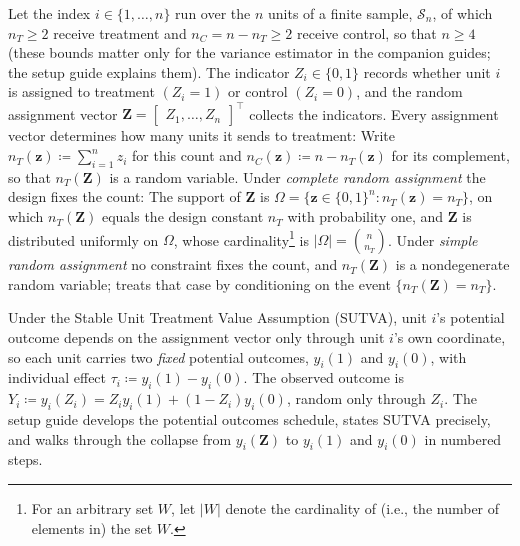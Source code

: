 \documentclass[12pt,leqno]{article}
\theoremstyle{newstyle}
\newcommand{\bZ}{\bm{Z}}   \newcommand{\bz}{\bm{z}}   %
\newcommand{\po}[2]{y_{#1}(#2)}     %
\begin{document}
Let the index $i \in \{1, \ldots , n\}$ run over the $n$ units of a finite sample, $\mathcal{S}_n$, of which $n_T \geq 2$ receive treatment and $n_C = n - n_T \geq 2$ receive control, so that $n \geq 4$ (these bounds matter only for the variance estimator in the companion guides; the setup guide explains them). The indicator $Z_i \in \{0, 1\}$ records whether unit $i$ is assigned to treatment $(Z_i = 1)$ or control $(Z_i = 0)$, and the random assignment vector $\bZ = \begin{bmatrix} Z_1, \dots , Z_n\end{bmatrix}^\top$ collects the indicators. Every assignment vector determines how many units it sends to treatment: Write $n_T(\bz) \coloneqq \sum_{i = 1}^n z_i$ for this count and $n_C(\bz) \coloneqq n - n_T(\bz)$ for its complement, so that $n_T(\bZ)$ is a random variable. Under \textit{complete random assignment} the design fixes the count: The support of $\bZ$ is $\Omega = \{\bz \in \{0, 1\}^n: n_T(\bz) = n_T\}$, on which $n_T(\bZ)$ equals the design constant $n_T$ with probability one, and $\bZ$ is distributed uniformly on $\Omega$, whose cardinality\footnote{For an arbitrary set $W$, let $\lvert W \rvert$ denote the cardinality of (i.e., the number of elements in) the set $W$.} is $\lvert \Omega \rvert = \binom{n}{n_T}$. Under \textit{simple random assignment} no constraint fixes the count, and $n_T(\bZ)$ is a nondegenerate random variable;  treats that case by conditioning on the event $\{n_T(\bZ) = n_T\}$.

Under the Stable Unit Treatment Value Assumption (SUTVA), unit $i$'s potential outcome depends on the assignment vector only through unit $i$'s own coordinate, so each unit carries two \textit{fixed} potential outcomes, $\po{i}{1}$ and $\po{i}{0}$, with individual effect $\tau_i \coloneqq \po{i}{1} - \po{i}{0}$. The observed outcome is $Y_i \coloneqq \po{i}{Z_i} = Z_i \po{i}{1} + (1 - Z_i)\po{i}{0}$, random only through $Z_i$. The setup guide develops the potential outcomes schedule, states SUTVA precisely, and walks through the collapse from $\po{i}{\bZ}$ to $\po{i}{1}$ and $\po{i}{0}$ in numbered steps.
\end{document}
